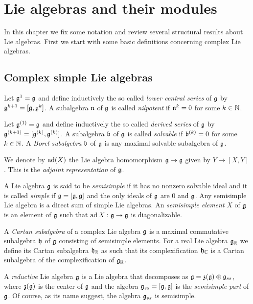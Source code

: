 \chapter{Lie algebras and their modules}

In this chapter we fix some notation and review several structural results about Lie algebras. First we start with some basic definitions concerning complex Lie algebras.

\medskip

\section{Complex simple Lie algebras}

Let $\mathfrak{g}^{1} = \mathfrak{g}$ and define inductively the so called \emph{lower central series} of $\mathfrak{g}$ by $\mathfrak{g}^{k+1} = [\mathfrak{g},\mathfrak{g}^{k}]$.  A subalgebra $\mathfrak{n}$ of $\mathfrak{g}$ is called \emph{nilpotent} if $\mathfrak{n}^{k} = 0$ for some $k\in\mathbb{N}$.

Let $\mathfrak{g}^{(1)} = \mathfrak{g}$ and define inductively the so called \emph{derived series} of $\mathfrak{g}$ by $\mathfrak{g}^{(k+1)} = [\mathfrak{g}^{(k)},\mathfrak{g}^{(k)}]$.  A subalgebra $\mathfrak{b}$ of $\mathfrak{g}$ is called \emph{solvable} if $\mathfrak{b}^{(k)} = 0$ for some $k\in\mathbb{N}$. A \emph{Borel subalgebra} $\mathfrak{b}$ of $\mathfrak{g}$ is any maximal solvable subalgebra of $\mathfrak{g}$.


We denote by $\operatorname{\mathrm{ad}}(X)$ the Lie algebra homomorphism $\mathfrak{g}\to \mathfrak{g}$ given by $Y\mapsto [X,Y]$. This is the \emph{adjoint representation} of $\mathfrak{g}$.

A  Lie algebra $\mathfrak{g}$ is said to be \emph{semisimple} if it has no nonzero solvable ideal and it is called \emph{simple} if $\mathfrak{g} = [\mathfrak{g},\mathfrak{g}]$ and the only ideals of $\mathfrak{g}$ are $0$ and $\mathfrak{g}$. Any semisimple Lie algebra is a direct sum of simple Lie algebras. An \emph{semisimple element} $X$ of $\mathfrak{g}$ is an element of $\mathfrak{g}$ such that $\operatorname{\mathrm{ad}} X: \mathfrak{g} \to \mathfrak{g}$ is diagonalizable.

A \emph{Cartan subalgebra} of a complex Lie algebra $\mathfrak{g}$ is a maximal commutative subalgebra $\mathfrak{h}$ of $\mathfrak{g}$ consisting of semisimple elements. For a real Lie algebra $\mathfrak{g}_{\mathbb{R}}$ we define its Cartan subalgebra $\mathfrak{h}_{\mathbb{R}}$ as such that its complexification $\mathfrak{h}_{\mathbb{C}}$ is a Cartan subalgebra of the complexification of $\mathfrak{g}_{\mathbb{R}}$.

A \emph{reductive} Lie algebra $\mathfrak{g}$ is a Lie algebra that decomposes as $\mathfrak{g} = \mathfrak{z(g)} \oplus \mathfrak{g}_{ss}$, where $\mathfrak{z(g)}$ is the center of $\mathfrak{g}$ and the algebra $\mathfrak{g}_{ss} = [\mathfrak{g},\mathfrak{g}]$ is the \emph{semisimple part} of $\mathfrak{g}$. Of course, as its name suggest, the algebra $\mathfrak{g}_{ss}$ is semisimple.

